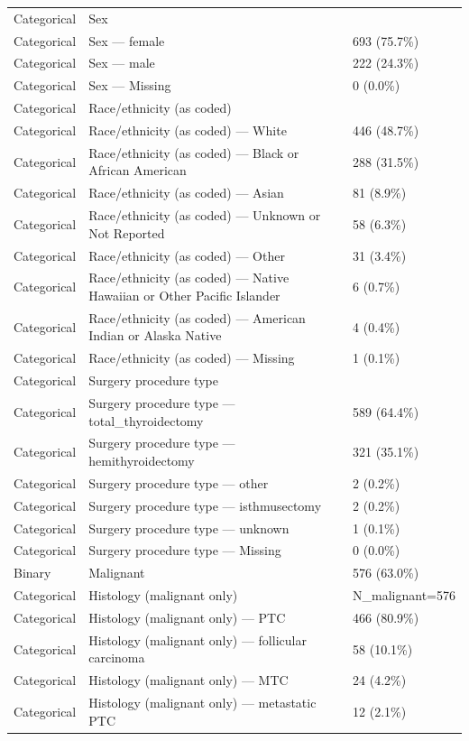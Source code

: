 \begin{table}[htbp]
\begin{tabular}{lll}
Categorical & Sex &  \\
Categorical & Sex — female & 693 (75.7\%) \\
Categorical & Sex — male & 222 (24.3\%) \\
Categorical & Sex — Missing & 0 (0.0\%) \\
Categorical & Race/ethnicity (as coded) &  \\
Categorical & Race/ethnicity (as coded) — White & 446 (48.7\%) \\
Categorical & Race/ethnicity (as coded) — Black or African American & 288 (31.5\%) \\
Categorical & Race/ethnicity (as coded) — Asian & 81 (8.9\%) \\
Categorical & Race/ethnicity (as coded) — Unknown or Not Reported & 58 (6.3\%) \\
Categorical & Race/ethnicity (as coded) — Other & 31 (3.4\%) \\
Categorical & Race/ethnicity (as coded) — Native Hawaiian or Other Pacific Islander & 6 (0.7\%) \\
Categorical & Race/ethnicity (as coded) — American Indian or Alaska Native & 4 (0.4\%) \\
Categorical & Race/ethnicity (as coded) — Missing & 1 (0.1\%) \\
Categorical & Surgery procedure type &  \\
Categorical & Surgery procedure type — total\_thyroidectomy & 589 (64.4\%) \\
Categorical & Surgery procedure type — hemithyroidectomy & 321 (35.1\%) \\
Categorical & Surgery procedure type — other & 2 (0.2\%) \\
Categorical & Surgery procedure type — isthmusectomy & 2 (0.2\%) \\
Categorical & Surgery procedure type — unknown & 1 (0.1\%) \\
Categorical & Surgery procedure type — Missing & 0 (0.0\%) \\
Binary & Malignant & 576 (63.0\%) \\
Categorical & Histology (malignant only) & N\_malignant=576 \\
Categorical & Histology (malignant only) — PTC & 466 (80.9\%) \\
Categorical & Histology (malignant only) — follicular carcinoma & 58 (10.1\%) \\
Categorical & Histology (malignant only) — MTC & 24 (4.2\%) \\
Categorical & Histology (malignant only) — metastatic PTC & 12 (2.1\%) \\

\end{tabular}
\end{table}
